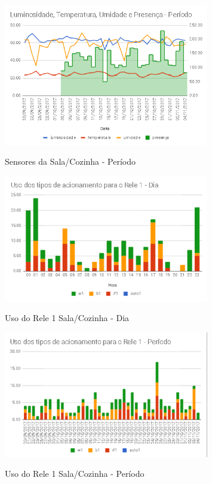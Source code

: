 \begin{figure}[H]
	\centering
	\caption{Sensores da Sala/Cozinha - Período}
	\includegraphics[width=0.8\textwidth]{sensoresperiodoSalaCozinha}
	\label{fig:sensoresperiodoSalaCozinha}
\end{figure}

\begin{figure}[H]
	\centering
	\caption{Uso do Rele 1 Sala/Cozinha - Dia}
	\includegraphics[width=0.8\textwidth]{usorele1salacozinhadia}
	\label{fig:usorele1salacozinhadia}
\end{figure}

\begin{figure}[H]
	\centering
	\caption{Uso do Rele 1 Sala/Cozinha - Período}
	\includegraphics[width=0.8\textwidth]{usorele1salacozinhaperiodo}
	\label{fig:usorele1salacozinhaperiodo}
\end{figure}

